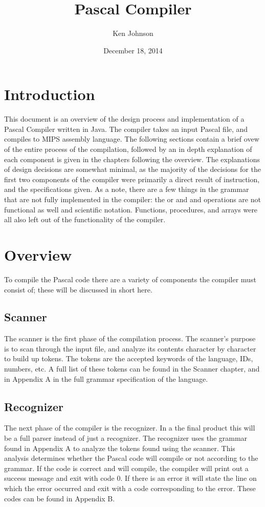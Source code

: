 \documentclass[12pt]{scrreprt}
\title{Pascal Compiler}
\author{Ken Johnson}
\date{December 18, 2014}
\begin{document}
\maketitle

\tableofcontents

\chapter{Introduction}
This document is an overview of the design process and implementation of a Pascal 
 Compiler written in Java. The compiler takes an input Pascal file, and compiles to MIPS
 assembly language. The following sections contain a brief ovew of the entire
 process of the compilation, followed by an in depth explanation of each component is
 given in the chapters following the overview. The explanations of design decisions
 are somewhat minimal, as the majority of the decisions for the first two
 components of the compiler were primarily a direct result of instruction, and 
 the specifications given. As a note, there are a few things in the grammar that 
are not fully implemented in the compiler: the or and and operations are not functional
as well and scientific notation. Functions, procedures, and arrays were all also left
out of the functionality of the compiler.
\chapter{Overview}
To compile the Pascal code there are a variety of components the compiler must consist
 of; these will be discussed in short here.
\section{Scanner}
The scanner is the first phase of the compilation process. The scanner's purpose is to scan
through the input file, and analyze its contents character by character to build up tokens.
 The tokens are the accepted keywords of the language, IDs, numbers, etc. A full list of 
 these tokens can be found in the Scanner chapter, and in Appendix A in the full grammar 
 specification of the language.

\section{Recognizer}
The next phase of the compiler is the recognizer. In a the final product this will be a 
full parser instead of just a recognizer. The recognizer uses the grammar found in Appendix 
A to analyze the tokens found using the scanner. This analysis determines whether the 
Pascal code will compile or not according to the grammar. If the code is correct and 
will compile, the compiler will print out a success message and exit with code 0. If there 
is an error it will state the line on which the error occurred and exit with a code 
corresponding to the error. These codes can be found in Appendix B.
\end{document}
